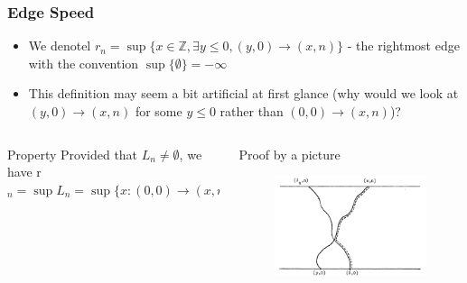 \begin{frame}
	\frametitle{Edge Speed}
	\begin{itemize}
		\item We denotel $r_{n} = \sup \{x \in \mathbb{Z}, \exists y \leq 0, (y, 0) \rightarrow (x, n)\}$ - the rightmost edge with the convention $\sup \{\emptyset\} = - \infty$
		\item This definition may seem a bit artificial at first glance (why would we look at $(y, 0) \rightarrow (x, n)$ for some $y \leq 0$ rather than $(0, 0) \rightarrow (x, n)$)?
	\end{itemize}
	
	\begin{columns}
	\begin{column}{0.4\textwidth}
		\begin{block}{Property}
			Provided that $L_{n} \neq \emptyset$, we have r$_{n} = \sup L_{n} = \sup \{x: (0, 0) \rightarrow (x, n) \} $
		\end{block}
	\end{column}
	\begin{column}{0.6\textwidth}
		\begin{block}{Proof by a picture}
			\begin{figure}
				\begin{center}
				\includegraphics[height = 0.5\textwidth]{image_edge_speed}
				\end{center}
			\end{figure}
		\end{block}
	\end{column}
	\end{columns}
\end{frame}


